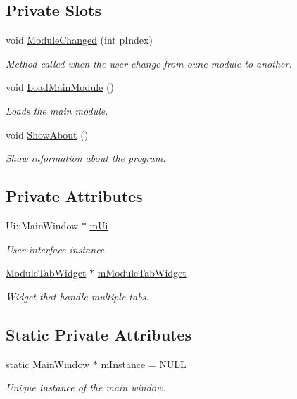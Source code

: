 \subsection*{Private Slots}
\begin{DoxyCompactItemize}
\item 
void \hyperlink{class_main_window_ac2ede332b234e694288c13cf4f5da8f2}{Module\+Changed} (int p\+Index)
\begin{DoxyCompactList}\small\item\em Method called when the user change from oune module to another. \end{DoxyCompactList}\item 
void \hyperlink{class_main_window_ad12bbb64e5dc16ff3b8cf2b675b74ad4}{Load\+Main\+Module} ()
\begin{DoxyCompactList}\small\item\em Loads the main module. \end{DoxyCompactList}\item 
void \hyperlink{class_main_window_a0a503fe5e4353e155482488e322842eb}{Show\+About} ()
\begin{DoxyCompactList}\small\item\em Show information about the program. \end{DoxyCompactList}\end{DoxyCompactItemize}
\subsection*{Private Attributes}
\begin{DoxyCompactItemize}
\item 
Ui\+::\+Main\+Window $\ast$ \hyperlink{class_main_window_ae726dc0c4cb46920180b2031664c5c93}{m\+Ui}
\begin{DoxyCompactList}\small\item\em User interface instance. \end{DoxyCompactList}\item 
\hyperlink{class_module_tab_widget}{Module\+Tab\+Widget} $\ast$ \hyperlink{class_main_window_a3c39b03b05e786a4cb7fc9796235a4ab}{m\+Module\+Tab\+Widget}
\begin{DoxyCompactList}\small\item\em Widget that handle multiple tabs. \end{DoxyCompactList}\end{DoxyCompactItemize}
\subsection*{Static Private Attributes}
\begin{DoxyCompactItemize}
\item 
static \hyperlink{class_main_window}{Main\+Window} $\ast$ \hyperlink{class_main_window_a867837bb5fb8e1a1193a08305e824954}{m\+Instance} = N\+U\+L\+L
\begin{DoxyCompactList}\small\item\em Unique instance of the main window. \end{DoxyCompactList}\end{DoxyCompactItemize}



